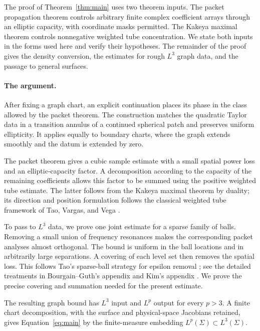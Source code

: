 The proof of Theorem~\ref{thm:main} uses two theorem inputs. The packet
propagation theorem \cite[Theorem~\PacketTheoremNumber]{OpenAIPacket2026}
controls
arbitrary finite complex coefficient arrays through an elliptic
capacity, with coordinate masks permitted. The Kakeya maximal
theorem \cite[Theorem~1.1]{OpenAIKakeya2026} controls nonnegative
weighted tube concentration. We state both inputs in the forms used
here and verify their hypotheses. The remainder of the proof gives
the density conversion, the estimates for rough \(L^3\) graph data,
and the passage to general surfaces.

\paragraph{The argument.}
After fixing a graph chart, an explicit continuation places its
phase in the class allowed by the packet theorem. The construction
matches the quadratic Taylor data in a transition annulus of a
continued spherical patch and preserves uniform ellipticity.
It applies equally to boundary charts, where the graph extends
smoothly and the datum is extended by zero.

The packet theorem gives a cubic sample estimate with a small
spatial power loss and an elliptic-capacity factor. A decomposition
according to the capacity of the remaining coefficients allows this
factor to be summed using the positive weighted tube estimate.
The latter follows from the Kakeya maximal theorem by duality;
its direction and position formulation follows the classical
weighted tube framework of Tao, Vargas, and Vega
\cite[arXiv version~1, Section~3]{TaoVargasVega1998}.

To pass to \(L^3\) data, we prove one joint estimate for a sparse
family of balls. Removing a small union of frequency resonances
makes the corresponding packet analyses almost orthogonal. The
bound is uniform in the ball locations and in arbitrarily large
separations. A covering of each level set then removes the spatial
loss. This follows Tao's sparse-ball strategy for epsilon removal
\cite{Tao1999Epsilon};
see the detailed treatments in Bourgain--Guth's appendix
\cite{BourgainGuth2011} and Kim's appendix \cite{Kim2017}.
We prove the precise covering and summation needed for the present
estimate.

The resulting graph bound has \(L^3\) input and \(L^p\) output
for every \(p>3\). A finite chart decomposition, with the surface
and physical-space Jacobians retained, gives
Equation~\eqref{eq:main} by the finite-measure embedding
\(L^p(\Sigma)\subset L^3(\Sigma)\).

